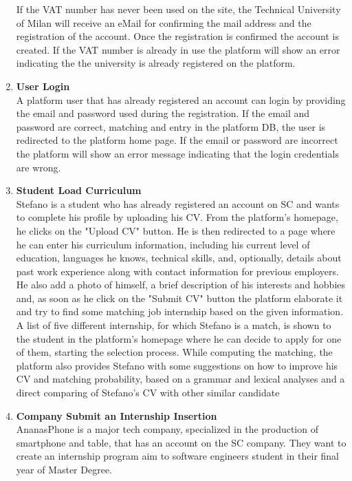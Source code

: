 \begin{enumerate}
        If the VAT number has never been used on the site, the Technical University of Milan will receive an eMail for confirming the mail address and the registration of the account. Once the registration is confirmed the account is created.
        If the VAT number is already in use the platform will show an error indicating the the university is already registered on the platform.
    \item \textbf{User Login}\\
        A platform user that has already registered an account can login by providing the email and password used during the registration. If the email and password are correct, matching and entry in the platform DB, the user is redirected to the platform home page. If the email or password are incorrect the platform will show an error message indicating that the login credentials are wrong.
    \item \textbf{Student Load Curriculum}\\
        Stefano is a student who has already registered an account on SC and wants to complete his profile by uploading his CV. From the platform's homepage, he clicks on the "Upload CV" button. He is then redirected to a page where he can enter his curriculum information, including his current level of education, languages he knows, technical skills, and, optionally, details about past work experience along with contact information for previous employers.
        He also add a photo of himself, a brief description of his interests and hobbies and, as soon as he click on the "Submit CV" button the platform elaborate it and try to find some matching job internship based on the given information.\\
        A list of five different internship, for which Stefano is a match, is shown to the student in the platform's homepage where he can decide to apply for one of them, starting the selection process.
        While computing the matching, the platform also provides Stefano with some suggestions on how to improve his CV and matching probability, based on a grammar and lexical analyses and a direct comparing of Stefano's CV with other similar candidate
    \item \textbf{Company Submit an Internship Insertion}\\
        AnanasPhone is a major tech company, specialized in the production of smartphone and table, that has an account on the SC company. They want to create an internship program aim to software engineers student in their final year of Master Degree.\\

\end{enumerate}
